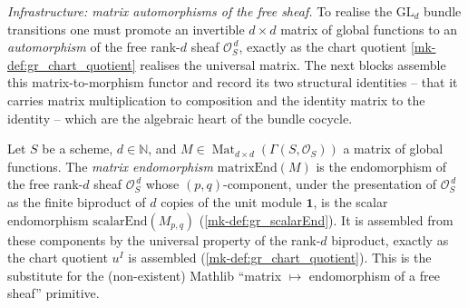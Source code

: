 \emph{Infrastructure: matrix automorphisms of the free sheaf.} To realise the
\(\mathrm{GL}_d\) bundle transitions one must promote an invertible \(d \times d\)
matrix of global functions to an \emph{automorphism} of the free rank-\(d\) sheaf
\(\mathcal{O}_S^{\,d}\), exactly as the chart quotient \ref{mk-def:gr_chart_quotient}
realises the universal matrix. The next blocks assemble this matrix-to-morphism
functor and record its two structural identities -- that it carries matrix
multiplication to composition and the identity matrix to the identity -- which are
the algebraic heart of the bundle cocycle.

\begin{definition}\label{mk-def:gr_matrixEnd}
  \leanok

  Let \(S\) be a scheme, \(d \in \mathbb{N}\), and
  \(M \in \operatorname{Mat}_{d \times d}(\Gamma(S, \mathcal{O}_S))\) a matrix of
  global functions. The \emph{matrix endomorphism} \(\mathrm{matrixEnd}(M)\) is the
  endomorphism of the free rank-\(d\) sheaf \(\mathcal{O}_S^{\,d}\) whose
  \((p,q)\)-component, under the presentation of \(\mathcal{O}_S^{\,d}\) as the
  finite biproduct of \(d\) copies of the unit module \(\mathbf{1}\), is the scalar
  endomorphism \(\mathrm{scalarEnd}(M_{p,q})\) (\ref{mk-def:gr_scalarEnd}). It is
  assembled from these components by the universal property of the rank-\(d\)
  biproduct, exactly as the chart quotient \(u^I\) is assembled
  (\ref{mk-def:gr_chart_quotient}). This is the substitute for the (non-existent)
  Mathlib ``matrix \(\mapsto\) endomorphism of a free sheaf'' primitive.
\end{definition}


